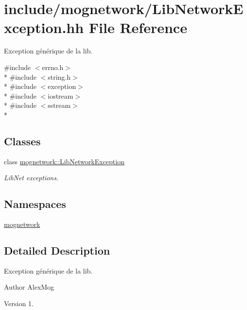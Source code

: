 \hypertarget{_lib_network_exception_8hh}{\section{include/mognetwork/\-Lib\-Network\-Exception.hh File Reference}
\label{_lib_network_exception_8hh}
}


Exception générique de la lib.  


{\ttfamily \#include $<$errno.\-h$>$}\\*
{\ttfamily \#include $<$string.\-h$>$}\\*
{\ttfamily \#include $<$exception$>$}\\*
{\ttfamily \#include $<$iostream$>$}\\*
{\ttfamily \#include $<$sstream$>$}\\*
\subsection*{Classes}
\begin{DoxyCompactItemize}
\item 
class \hyperlink{classmognetwork_1_1_lib_network_exception}{mognetwork\-::\-Lib\-Network\-Exception}
\begin{DoxyCompactList}\small\item\em Lib\-Net exceptions. \end{DoxyCompactList}\end{DoxyCompactItemize}
\subsection*{Namespaces}
\begin{DoxyCompactItemize}
\item 
\hyperlink{namespacemognetwork}{mognetwork}
\end{DoxyCompactItemize}


\subsection{Detailed Description}
Exception générique de la lib. \begin{DoxyAuthor}{Author}
Alex\-Mog 
\end{DoxyAuthor}
\begin{DoxyVersion}{Version}
1. 
\end{DoxyVersion}
